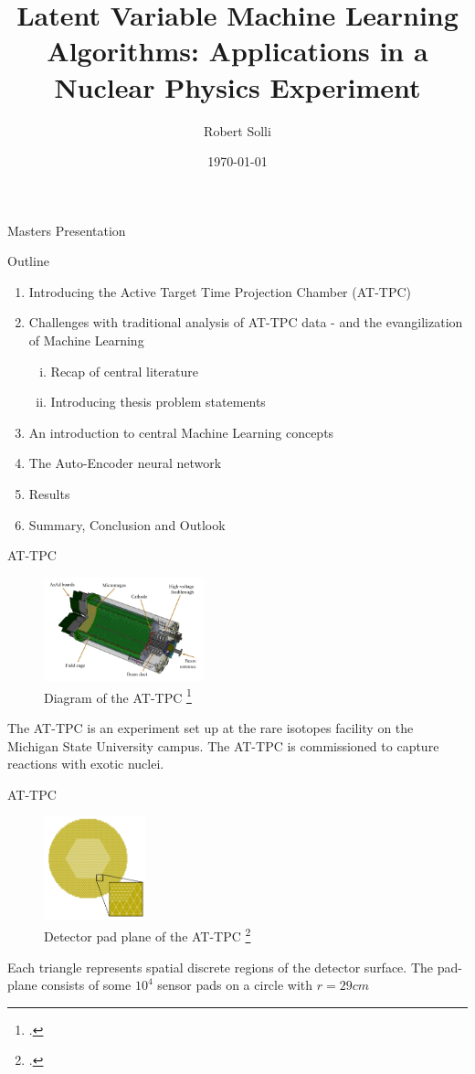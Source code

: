 \documentclass{beamer}
\title{Latent Variable Machine Learning Algorithms: Applications in a Nuclear Physics Experiment
}
\author{Robert Solli}
\institute{University of Oslo, Expert Analytics AS}
\date{\today}
\begin{document}
\begin{frame}[t]{Masters Presentation}
	\titlepage
\end{frame}

\begin{frame}[t]{Outline}
	\begin{enumerate}
		\item Introducing the Active Target Time Projection Chamber (AT-TPC)
		\item Challenges with traditional analysis of AT-TPC data - and the evangilization of Machine Learning
			\begin{enumerate}[(i)]
				\item Recap of central literature 
				\item Introducing thesis problem statements
			\end{enumerate}
		\item An introduction to central Machine Learning concepts
		\item The Auto-Encoder neural network
		\item Results 
		\item Summary, Conclusion and Outlook
	\end{enumerate}
\end{frame}

\begin{frame}[t]{AT-TPC}
	\begin{figure}
		\centering
		\includegraphics[height=3cm]{../chapters/experimental_background/plots/at_tpc_schematic.png}
		\caption{Diagram of the AT-TPC \footcite{Bradt2017a}}\label{fig:attpc}
	\end{figure}
	The AT-TPC is an experiment set up at the rare isotopes facility on the Michigan State University campus. The AT-TPC is commissioned to capture reactions with exotic nuclei.
\end{frame}

\begin{frame}[t]{AT-TPC}
	\begin{figure}
		\centering
		\includegraphics[height=3cm]{../chapters/experimental_background/plots/at_tpc_padplane.png}
		\caption{Detector pad plane of the AT-TPC \footcite{Bradt2017a}}\label{fig:padplane}
	\end{figure}
	Each triangle represents spatial discrete regions of the detector surface. The pad-plane consists of some $10^4$ sensor pads on a circle with $r=29cm$
\end{frame}
\end{document}
